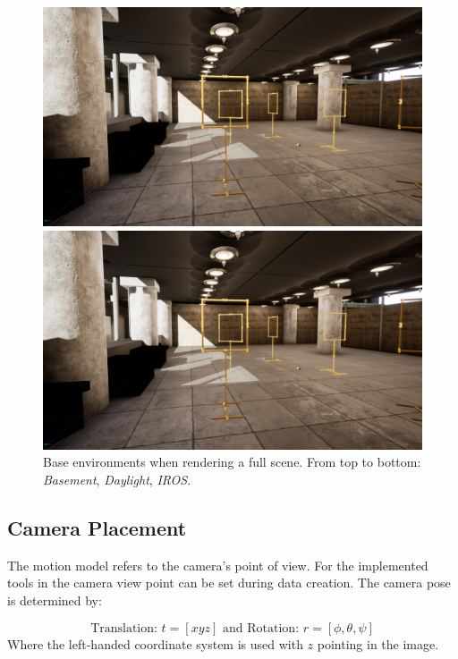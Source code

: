 \begin{figure}[hbtp]
\begin{minipage}{0.49\textwidth}
	\includegraphics[width=\textwidth]{fig/iros_perspective}
\end{minipage}
\begin{minipage}{0.49\textwidth}
	\includegraphics[width=\textwidth]{fig/iros_perspective}
\end{minipage}
\caption{Base environments when rendering a full scene. From top to bottom: \textit{Basement}, \textit{Daylight}, \textit{IROS}.}
\label{fig:environments}
\end{figure}

\subsection{Camera Placement}

The motion model refers to the camera's point of view. For the implemented tools in  the camera view point can be set during data creation. The camera pose is determined by:

$$
\text{Translation: }t = [x y z] \text{ and Rotation: } r = [\phi, \theta, \psi]
$$
Where the left-handed coordinate system is used with $z$ pointing in the image.

